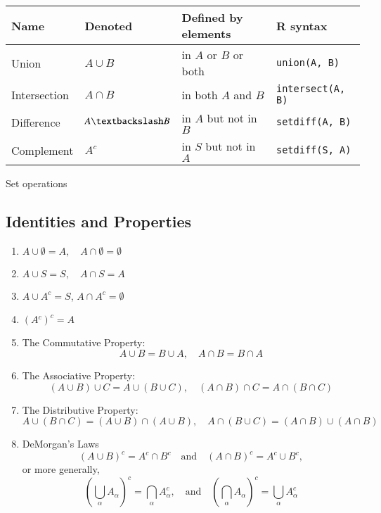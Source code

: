 \documentclass[captions=tableheading]{scrbook}
\begin{document}
\begin{center}
\begin{tabular}{llll}
 Name          &  Denoted              &  Defined by elements    &  \textsf{R} syntax         \\
\hline
 Union         &  $A\cup B$            &  in $A$ or $B$ or both  &  \texttt{union(A, B)}      \\
 Intersection  &  $A\cap B$            &  in both $A$ and $B$    &  \texttt{intersect(A, B)}  \\
 Difference    &  $A\textbackslash B$  &  in $A$ but not in $B$  &  \texttt{setdiff(A, B)}    \\
 Complement    &  $A^{c}$              &  in $S$ but not in $A$  &  \texttt{setdiff(S, A)}    \\
\end{tabular}
\end{center}


\caption{Set operations\label{tab:Set-Operations}}
\subsection{Identities and Properties}
\label{sec-6-1-2}


\begin{enumerate}
\item $A\cup\emptyset=A,\quad A\cap\emptyset=\emptyset$
\item $A\cup S=S,\quad A\cap S=A$
\item $A\cup A^{c}=S$, $A\cap A^{c}=\emptyset$
\item $(A{}^{c})^{c}=A$
\item The Commutative Property: 
   \begin{equation}
   A \cup B = B\cup A,\quad A\cap B = B\cap A
   \end{equation}
\item The Associative Property: 
   \begin{equation}
   (A\cup B)\cup C=A\cup(B\cup C),\quad(A\cap B)\cap C=A\cap(B\cap C)
   \end{equation}
\item The Distributive Property: 
   \begin{equation}
   A\cup(B\cap C)=(A\cup B)\cap(A\cup B),\quad A\cap(B\cup C)=(A\cap B)\cup(A\cap B)
   \end{equation}
\item DeMorgan's Laws
   \begin{equation}
   (A\cup B)^{c}=A^{c}\cap B^{c}\quad\mbox{and}\quad(A\cap B)^{c}=A^{c}\cup B^{c},
   \end{equation}
   or more generally,
   \begin{equation}
   \left(\bigcup_{\alpha}A_{\alpha}\right)^{c}=\bigcap_{\alpha}A_{\alpha}^{c},\quad\mbox{and}\quad\left(\bigcap_{\alpha}A_{\alpha}\right)^{c}=\bigcup_{\alpha}A_{\alpha}^{c}
   \end{equation}
\end{enumerate}
\end{document}
